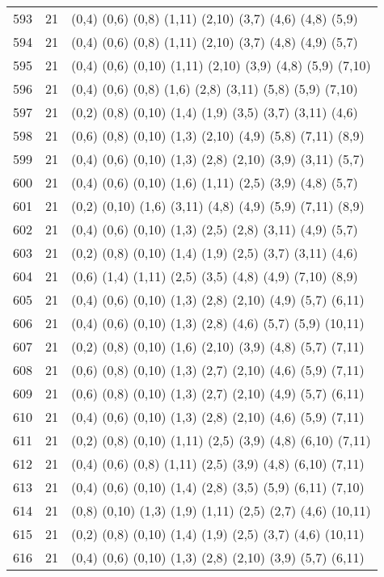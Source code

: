 {\begin{longtable}{lll}
593 & 21 & (0,4) (0,6) (0,8) (1,11) (2,10) (3,7) (4,6) (4,8) (5,9) \\
594 & 21 & (0,4) (0,6) (0,8) (1,11) (2,10) (3,7) (4,8) (4,9) (5,7) \\
595 & 21 & (0,4) (0,6) (0,10) (1,11) (2,10) (3,9) (4,8) (5,9) (7,10) \\
596 & 21 & (0,4) (0,6) (0,8) (1,6) (2,8) (3,11) (5,8) (5,9) (7,10) \\
597 & 21 & (0,2) (0,8) (0,10) (1,4) (1,9) (3,5) (3,7) (3,11) (4,6) \\
598 & 21 & (0,6) (0,8) (0,10) (1,3) (2,10) (4,9) (5,8) (7,11) (8,9) \\
599 & 21 & (0,4) (0,6) (0,10) (1,3) (2,8) (2,10) (3,9) (3,11) (5,7) \\
600 & 21 & (0,4) (0,6) (0,10) (1,6) (1,11) (2,5) (3,9) (4,8) (5,7) \\
601 & 21 & (0,2) (0,10) (1,6) (3,11) (4,8) (4,9) (5,9) (7,11) (8,9) \\
602 & 21 & (0,4) (0,6) (0,10) (1,3) (2,5) (2,8) (3,11) (4,9) (5,7) \\
603 & 21 & (0,2) (0,8) (0,10) (1,4) (1,9) (2,5) (3,7) (3,11) (4,6) \\
604 & 21 & (0,6) (1,4) (1,11) (2,5) (3,5) (4,8) (4,9) (7,10) (8,9) \\
605 & 21 & (0,4) (0,6) (0,10) (1,3) (2,8) (2,10) (4,9) (5,7) (6,11) \\
606 & 21 & (0,4) (0,6) (0,10) (1,3) (2,8) (4,6) (5,7) (5,9) (10,11) \\
607 & 21 & (0,2) (0,8) (0,10) (1,6) (2,10) (3,9) (4,8) (5,7) (7,11) \\
608 & 21 & (0,6) (0,8) (0,10) (1,3) (2,7) (2,10) (4,6) (5,9) (7,11) \\
609 & 21 & (0,6) (0,8) (0,10) (1,3) (2,7) (2,10) (4,9) (5,7) (6,11) \\
610 & 21 & (0,4) (0,6) (0,10) (1,3) (2,8) (2,10) (4,6) (5,9) (7,11) \\
611 & 21 & (0,2) (0,8) (0,10) (1,11) (2,5) (3,9) (4,8) (6,10) (7,11) \\
612 & 21 & (0,4) (0,6) (0,8) (1,11) (2,5) (3,9) (4,8) (6,10) (7,11) \\
613 & 21 & (0,4) (0,6) (0,10) (1,4) (2,8) (3,5) (5,9) (6,11) (7,10) \\
614 & 21 & (0,8) (0,10) (1,3) (1,9) (1,11) (2,5) (2,7) (4,6) (10,11) \\
615 & 21 & (0,2) (0,8) (0,10) (1,4) (1,9) (2,5) (3,7) (4,6) (10,11) \\
616 & 21 & (0,4) (0,6) (0,10) (1,3) (2,8) (2,10) (3,9) (5,7) (6,11) \\

\end{longtable}}
